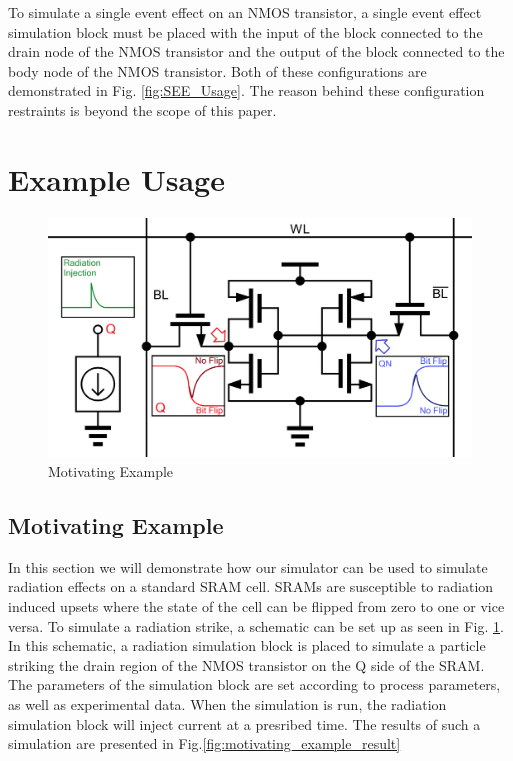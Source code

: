 \documentclass[conference]{IEEEtran}
\begin{document}
    To simulate a single event effect on an NMOS transistor, a single event effect simulation block must be placed with the input of the block connected to the drain node of the NMOS transistor and the output of the block connected to the body node of the NMOS transistor.
    Both of these configurations are demonstrated in Fig. \ref{fig:SEE_Usage}.
    The reason behind these configuration restraints is beyond the scope of this paper.

	\section{Example Usage}\label{sec:example-usage}
	\begin{figure}[htbp]
        \centering
        \includegraphics[width=0.95\linewidth]{sram_circuit_detailed}
        \caption{Motivating Example}
        \label{fig:motivating_example}
    \end{figure}    
    
    \subsection{Motivating Example}\label{subsec:motivating-example}
    In this section we will demonstrate how our simulator can be used to simulate radiation effects on a standard SRAM cell. SRAMs are susceptible to radiation induced upsets where the state of the cell can be flipped from zero to one or vice versa. To simulate a radiation strike, a schematic can be set up as seen in Fig. \ref{fig:motivating_example}. In this schematic, a radiation simulation block is placed to simulate a particle striking the drain region of the NMOS transistor on the Q side of the SRAM. The parameters of the simulation block are set according to process parameters, as well as experimental data. When the simulation is run, the radiation simulation block will inject current at a presribed time. The results of such a simulation are presented in Fig.\ref{fig:motivating_example_result}
    
\end{document}
